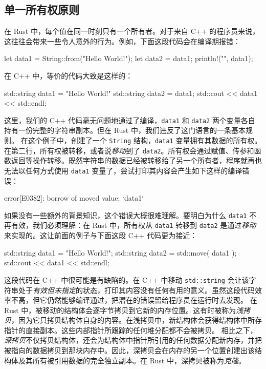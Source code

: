 \subsection{单一所有权原则}
\label{idx:idx_8b2640dd}
在 Rust 中，每个值在同一时刻只有一个所有者。对于来自 C++ 的程序员来说，这往往会带来一些令人意外的行为。例如，下面这段代码会在编译期报错：
\begin{codebox}[rust]
let data1 = String::from("Hello World!");
let data2 = data1;
println!("{}", data1);
\end{codebox}
在 C++ 中，等价的代码大致是这样的：
\begin{codebox}[rust]
std::string data1 = "Hello World!"
std::string data2 = data1;
std::cout << data1 << std::endl;
\end{codebox}
这里，我们的 C++ 代码毫无问题地通过了编译，\texttt{data1} 和 \texttt{data2} 两个变量各自持有一份完整的字符串副本。但在 Rust 中，我们违反了这门语言的一条基本规则。
在这个例子中，创建了一个 \texttt{String} 结构，\texttt{data1} 变量拥有其数据的所有权。在第二行，所有权被转移，或者说\emph{移动}到了 \texttt{data2}。所有权会通过赋值、传参和函数返回等操作转移。既然字符串的数据已经被转移给了另一个所有者，程序就再也无法以任何方式使用 \texttt{data1} 变量了，尝试打印其内容会产生如下这样的编译错误：
\begin{codeboxdark}
error[E0382]: borrow of moved value: `data1`
\end{codeboxdark}
\label{idx:idx_6a028789}
如果没有一些额外的背景知识，这个错误大概很难理解。要明白为什么
\texttt{data1} 不再有效，我们必须理解：在 Rust 中，所有权从 \texttt{data1} 转移到 \texttt{data2} 是通过\emph{移动}来实现的。这让前面的例子与下面这段 C++
代码更为接近：
\begin{codebox}[rust]
std::string data1 = "Hello World!";
std::string data2 = std::move( data1 );
std::cout << data1 << std::endl;
\end{codebox}
这段代码在 C++ 中很可能是有缺陷的。在 C++ 中移动 \texttt{std::string} 会让该字符串处于\emph{有效但未指定}的状态，打印其内容没有任何有用的意义。虽然这段代码效率不高，但它仍然能够编译通过，把潜在的错误留给程序员在运行时去发现。
\label{idx:idx_386732c9}
在 Rust 中，被移动的结构体会逐字节拷贝到它新的内存位置。这有时被称为\emph{浅拷贝}，因为它只拷贝结构体自身的内容。在浅拷贝中，新结构体会获得结构体中所存指针的直接副本。这些内部指针所跟踪的任何堆分配都不会被拷贝。
\label{idx:idx_263db87c}
\label{idx:idx_0c9c8950}
相比之下，\emph{深拷贝}不仅拷贝结构体，还会为结构体中指针所引用的任何数据分配新内存，并把被指向的数据拷贝到那块内存中。因此，深拷贝会在内存的另一个位置创建出该结构体及其所有被引用数据的完全独立副本。在 Rust 中，深拷贝被称为\emph{克隆}。
